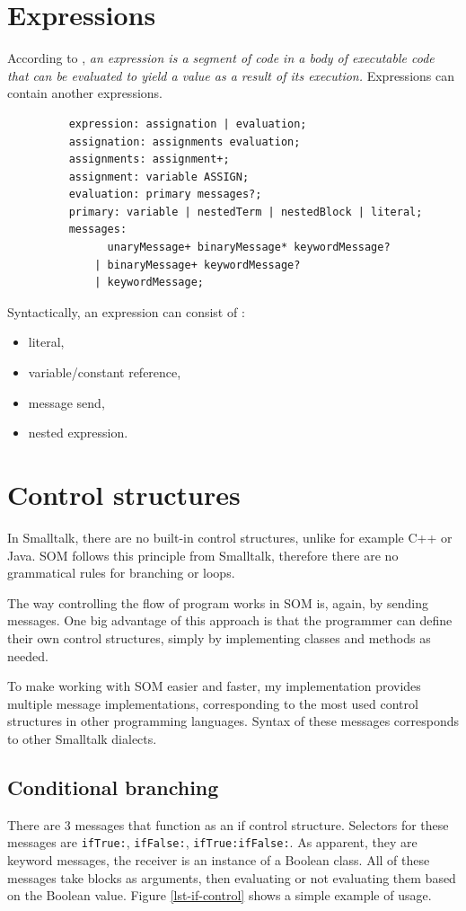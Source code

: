 \documentclass[thesis=M,english]{FITthesis}[2019/12/23]
\begin{document}
\section{Expressions}
According to \cite{smalltalk-essentials}, \textit{an expression is a segment of code in a body of executable code
that can be evaluated to yield a value as a result of its execution.} Expressions can contain another expressions.

\begin{figure}
	\begin{verbatim}
	expression: assignation | evaluation;
	assignation: assignments evaluation;
	assignments: assignment+;
	assignment: variable ASSIGN;
	evaluation: primary messages?;
	primary: variable | nestedTerm | nestedBlock | literal;
	messages:
		  unaryMessage+ binaryMessage* keywordMessage?
		| binaryMessage+ keywordMessage?
		| keywordMessage;
	\end{verbatim}
\end{figure}

Syntactically, an expression can consist of \cite{smalltalk-essentials}:
\begin{itemize}
	\item literal,
	\item variable/constant reference,
	\item message send,
	\item nested expression.
\end{itemize}

\section{Control structures}
In Smalltalk, there are no built-in control structures, unlike for example C++ or Java. SOM follows this principle
from Smalltalk, therefore there are no grammatical rules for branching or loops.

The way controlling the flow of program works in SOM is, again, by sending messages. One big advantage of this 
approach is that the programmer can define their own control structures, simply by implementing classes and
methods as needed.

To make working with SOM easier and faster, my implementation provides multiple message implementations, 
corresponding to the most used control structures in other programming languages. Syntax of these messages
corresponds to other Smalltalk dialects.

\subsection{Conditional branching}
There are 3 messages that function as an if control structure. Selectors for these messages are \texttt{ifTrue:},
\texttt{ifFalse:}, \texttt{ifTrue:ifFalse:}. As apparent, they are keyword messages, the receiver is an instance of
a Boolean class. All of these messages take blocks as arguments, then evaluating or not evaluating them based on
the Boolean value. Figure \ref{lst-if-control} shows a simple example of usage.
\end{document}
